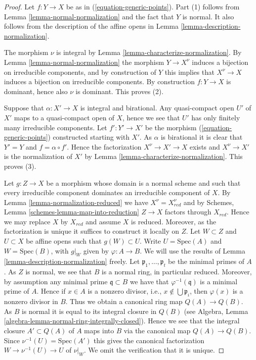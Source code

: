 \begin{proof}
Let $f : Y \to X$ be as in (\ref{equation-generic-points}).
Part (1) follows from Lemma \ref{lemma-normal-normalization}
and the fact that $Y$ is normal. It also follows from the description
of the affine opens in Lemma \ref{lemma-description-normalization}.

\medskip\noindent
The morphism $\nu$ is integral by Lemma \ref{lemma-characterize-normalization}.
By Lemma \ref{lemma-normal-normalization} the
morphism $Y \to X^\nu$ induces a bijection on irreducible components,
and by construction of $Y$ this implies that $X^\nu \to X$ induces
a bijection on irreducible components. By construction $f : Y \to X$
is dominant, hence also $\nu$ is dominant. This proves (2).

\medskip\noindent
Suppose that $\alpha : X' \to X$ is integral and birational.
Any quasi-compact open $U'$ of $X'$ maps to a quasi-compact open
of $X$, hence we see that $U'$ has only finitely many irreducible
components. Let $f' : Y' \to X'$ be the morphism
(\ref{equation-generic-points}) constructed starting with $X'$.
As $\alpha$ is birational
it is clear that $Y' = Y$ and $f = \alpha \circ f'$. Hence
the factorization $X^\nu \to X' \to X$ exists
and $X^\nu \to X'$ is the normalization of $X'$ by
Lemma \ref{lemma-characterize-normalization}. This proves (3).

\medskip\noindent
Let $g : Z \to X$ be a morphism whose domain is a normal scheme
and such that every irreducible component dominates an irreducible
component of $X$. By Lemma \ref{lemma-normalization-reduced}
we have $X^\nu = X_{red}^\nu$ and by
Schemes, Lemma \ref{schemes-lemma-map-into-reduction}
$Z \to X$ factors through $X_{red}$. Hence we may replace $X$ by
$X_{red}$ and assume $X$ is reduced. Moreover, as the factorization
is unique it suffices to construct it locally on $Z$.
Let $W \subset Z$ and $U \subset X$ be affine opens
such that $g(W) \subset U$. Write $U = \text{Spec}(A)$ and
$W = \text{Spec}(B)$, with $g|_W$ given by $\varphi : A \to B$.
We will use the results of Lemma \ref{lemma-description-normalization} freely.
Let $\mathfrak p_1, \ldots, \mathfrak p_t$ be the minimal primes of $A$.
As $Z$ is normal, we see that $B$ is a normal
ring, in particular reduced. Moreover, by assumption any minimal
prime $\mathfrak q \subset B$ we have that $\varphi^{-1}(\mathfrak q)$
is a minimal prime of $A$. Hence if $x \in A$ is a nonzero divisor, i.e.,
$x \not \in \bigcup \mathfrak p_i$, then $\varphi(x)$ is a nonzero divisor
in $B$. Thus we obtain a canonical ring map $Q(A) \to Q(B)$. As $B$ is
normal it is equal to its integral closure in $Q(B)$ (see
Algebra, Lemma \ref{algebra-lemma-normal-ring-integrally-closed}).
Hence we see that the integral closure $A' \subset Q(A)$ of $A$
maps into $B$ via the canonical map $Q(A) \to Q(B)$.
Since $\nu^{-1}(U) = \text{Spec}(A')$ this gives the canonical
factorization $W \to \nu^{-1}(U) \to U$ of $\nu|_W$.
We omit the verification that it is unique.
\end{proof}

